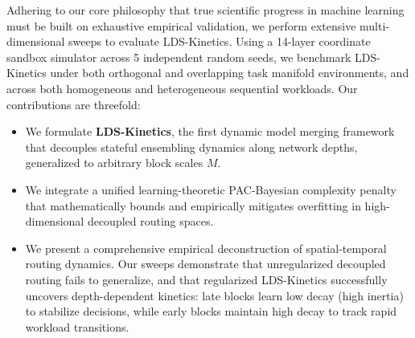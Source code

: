 Adhering to our core philosophy that true scientific progress in machine learning must be built on exhaustive empirical validation, we perform extensive multi-dimensional sweeps to evaluate LDS-Kinetics. Using a 14-layer coordinate sandbox simulator across 5 independent random seeds, we benchmark LDS-Kinetics under both orthogonal and overlapping task manifold environments, and across both homogeneous and heterogeneous sequential workloads. Our contributions are threefold:
\begin{itemize}
    \item We formulate \textbf{LDS-Kinetics}, the first dynamic model merging framework that decouples stateful ensembling dynamics along network depths, generalized to arbitrary block scales $M$.
    \item We integrate a unified learning-theoretic PAC-Bayesian complexity penalty that mathematically bounds and empirically mitigates overfitting in high-dimensional decoupled routing spaces.
    \item We present a comprehensive empirical deconstruction of spatial-temporal routing dynamics. Our sweeps demonstrate that unregularized decoupled routing fails to generalize, and that regularized LDS-Kinetics successfully uncovers depth-dependent kinetics: late blocks learn low decay (high inertia) to stabilize decisions, while early blocks maintain high decay to track rapid workload transitions.
\end{itemize}
